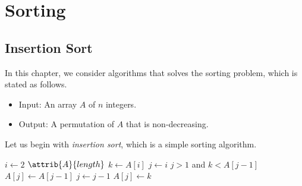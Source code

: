 \chapter{Sorting}
\section{Insertion Sort}
In this chapter, we consider algorithms that solves the sorting problem, which
is stated as follows.
\begin{problem}
  \leavevmode
  \begin{itemize}
    \item Input: An array $A$ of $n$ integers.
    \item Output: A permutation of $A$ that is non-decreasing.
  \end{itemize}
\end{problem}

\noindent
Let us begin with \emph{insertion sort}, which is a simple sorting algorithm.
\begin{codebox}
  \li \For $i \gets 2$ \To $\attrib{A}{length}$ \Do
  \li     $k \gets A[i]$
  \li     $j \gets i$
  \li     \While $j > 1$ and $k < A[j - 1]$ \Do
  \li         $A[j] \gets A[j - 1]$
  \li         $j \gets j - 1$
          \End
  \li     $A[j] \gets k$
      \End
\end{codebox}

